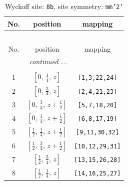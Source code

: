 \documentclass[fleqn,8pt]{jsarticle}
\begin{document}
\begin{longtable}{ccc}
\caption{Wyckoff site: {\tt 8b}, site symmetry: {\tt mm'2'}}
 \\
 \hline \hline
No. & position & mapping \\ \hline \endfirsthead

\multicolumn{2}{l}{\tablename\ \thetable{}} \\
 \hline \hline
No. & position & mapping \\ \hline \endhead

 \hline \hline
\multicolumn{2}{r}{\footnotesize\it continued ...} \\ \endfoot

 \hline \hline
\multicolumn{2}{r}{} \\ \endlastfoot

1 & $\left[ 0,\, \frac{1}{4},\, z \right]$ & {\tt [1,3,22,24]} \\ \hline
2 & $\left[ 0,\, \frac{3}{4},\, z \right]$ & {\tt [2,4,21,23]} \\ \hline
3 & $\left[ 0,\, \frac{3}{4},\, z + \frac{1}{2} \right]$ & {\tt [5,7,18,20]} \\ \hline
4 & $\left[ 0,\, \frac{1}{4},\, z + \frac{1}{2} \right]$ & {\tt [6,8,17,19]} \\ \hline
5 & $\left[ \frac{1}{2},\, \frac{1}{4},\, z + \frac{1}{2} \right]$ & {\tt [9,11,30,32]} \\ \hline
6 & $\left[ \frac{1}{2},\, \frac{3}{4},\, z + \frac{1}{2} \right]$ & {\tt [10,12,29,31]} \\ \hline
7 & $\left[ \frac{1}{2},\, \frac{3}{4},\, z \right]$ & {\tt [13,15,26,28]} \\ \hline
8 & $\left[ \frac{1}{2},\, \frac{1}{4},\, z \right]$ & {\tt [14,16,25,27]} \\
\end{longtable}
\renewcommand{\arraystretch}{1.2}
\end{document}
